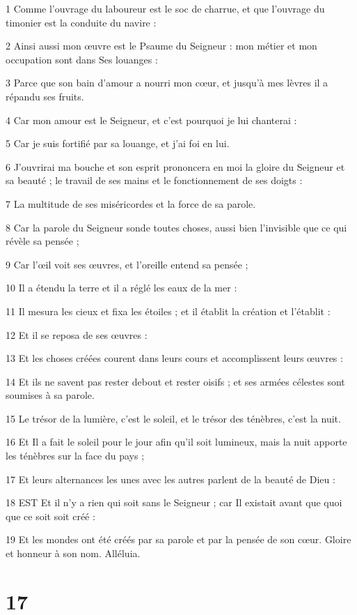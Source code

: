 \par 1 Comme l'ouvrage du laboureur est le soc de charrue, et que l'ouvrage du timonier est la conduite du navire :
\par 2 Ainsi aussi mon œuvre est le Psaume du Seigneur : mon métier et mon occupation sont dans Ses louanges :
\par 3 Parce que son bain d'amour a nourri mon cœur, et jusqu'à mes lèvres il a répandu ses fruits.
\par 4 Car mon amour est le Seigneur, et c'est pourquoi je lui chanterai :
\par 5 Car je suis fortifié par sa louange, et j'ai foi en lui.
\par 6 J'ouvrirai ma bouche et son esprit prononcera en moi la gloire du Seigneur et sa beauté ; le travail de ses mains et le fonctionnement de ses doigts :
\par 7 La multitude de ses miséricordes et la force de sa parole.
\par 8 Car la parole du Seigneur sonde toutes choses, aussi bien l'invisible que ce qui révèle sa pensée ;
\par 9 Car l'œil voit ses œuvres, et l'oreille entend sa pensée ;
\par 10 Il a étendu la terre et il a réglé les eaux de la mer :
\par 11 Il mesura les cieux et fixa les étoiles ; et il établit la création et l'établit :
\par 12 Et il se reposa de ses œuvres :
\par 13 Et les choses créées courent dans leurs cours et accomplissent leurs œuvres :
\par 14 Et ils ne savent pas rester debout et rester oisifs ; et ses armées célestes sont soumises à sa parole.
\par 15 Le trésor de la lumière, c'est le soleil, et le trésor des ténèbres, c'est la nuit.
\par 16 Et Il a fait le soleil pour le jour afin qu'il soit lumineux, mais la nuit apporte les ténèbres sur la face du pays ;
\par 17 Et leurs alternances les unes avec les autres parlent de la beauté de Dieu :
\par 18 EST Et il n'y a rien qui soit sans le Seigneur ; car Il existait avant que quoi que ce soit soit créé :
\par 19 Et les mondes ont été créés par sa parole et par la pensée de son cœur. Gloire et honneur à son nom. Alléluia.

\chapter{17}

